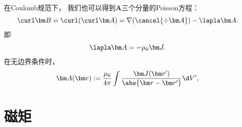 \begin{corollary}
    在Coulomb规范下，
    我们也可以得到$\bm A$三个分量的Poisson方程：
    \[
        \curl\bm B=\curl(\curl\bm A)=\nabla(\cancel{\div\bm A})-\lapla\bm A.
    \]
    即
    \begin{equation}
        \lapla\bm A=-\mu_0\bm J.
    \end{equation}
    在无边界条件时，
    \begin{equation}
        \label{eqn:A-J}
        \bm A(\bm r):=\frac{\mu_0}{4\pi}\int\frac{\bm J(\bm r')}{\abs{\bm r-\bm r'}}\d V',
    \end{equation}
\end{corollary}

\section{磁矩}
\label{sec:magnetic moment}

